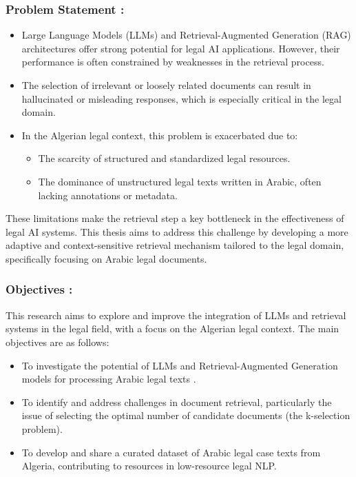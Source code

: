 \subsubsection*{Problem Statement :} 


\begin{itemize}
	\item Large Language Models (LLMs) and Retrieval-Augmented Generation (RAG) architectures offer strong potential for legal AI applications.
	However, their performance is often constrained by weaknesses in the retrieval process.
	\item The selection of irrelevant or loosely related documents can result in hallucinated or misleading responses, which is especially critical in the legal domain.
	\item In the Algerian legal context\cite{inproceedings}, this problem is exacerbated due to:
	\begin{itemize}
		\item The scarcity of structured and standardized legal resources.
		\item The dominance of unstructured legal texts written in Arabic, often lacking annotations or metadata.
	\end{itemize}
\end{itemize}
 These limitations make the retrieval step a key bottleneck in the effectiveness of legal AI systems.
 This thesis aims to address this challenge by developing a more adaptive and context-sensitive retrieval mechanism tailored to the legal domain, specifically focusing on Arabic legal documents.


\subsubsection*{Objectives :} 
This research aims to explore and improve the integration of LLMs and retrieval systems in the legal field, with a focus on the Algerian legal context.   
 The main objectives are as follows:
\begin{itemize}
	\item To investigate the potential of LLMs and Retrieval-Augmented Generation models for processing Arabic legal texts .
	\item To identify and address challenges in document retrieval, particularly the issue of selecting the optimal number of candidate documents (the k-selection problem).
	\item To develop and share a curated dataset of Arabic legal case texts from Algeria, contributing to resources in low-resource legal NLP.
\end{itemize}
